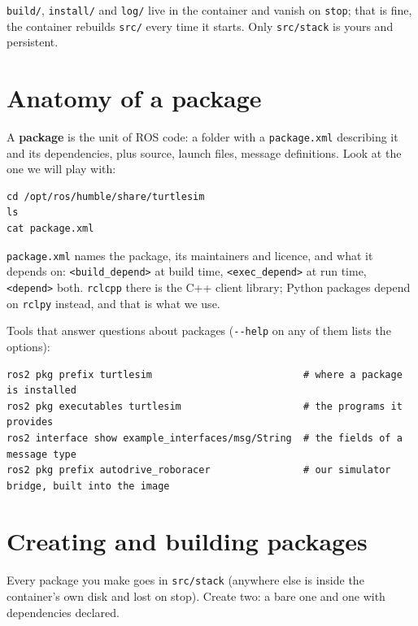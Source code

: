 \documentclass[11pt,a4paper]{article}
\begin{document}
\texttt{build/}, \texttt{install/} and \texttt{log/} live in the container and vanish on
\texttt{stop}; that is fine, the container rebuilds \texttt{src/} every time it starts. Only
\texttt{src/stack} is yours and persistent.


\section{Anatomy of a package}

A \textbf{package} is the unit of ROS code: a folder with a \texttt{package.xml} describing it
and its dependencies, plus source, launch files, message definitions. Look at the one we will
play with:

\begin{lstlisting}
cd /opt/ros/humble/share/turtlesim
ls
cat package.xml
\end{lstlisting}

\texttt{package.xml} names the package, its maintainers and licence, and what it depends on:
\texttt{<build\_depend>} at build time, \texttt{<exec\_depend>} at run time,
\texttt{<depend>} both. \texttt{rclcpp} there is the C++ client library; Python packages depend on \texttt{rclpy}
instead, and that is what we use.

Tools that answer questions about packages (\texttt{-{}-help} on any of them lists the options):

\begin{lstlisting}
ros2 pkg prefix turtlesim                          # where a package is installed
ros2 pkg executables turtlesim                     # the programs it provides
ros2 interface show example_interfaces/msg/String  # the fields of a message type
ros2 pkg prefix autodrive_roboracer                # our simulator bridge, built into the image
\end{lstlisting}

\section{Creating and building packages}

Every package you make goes in \texttt{src/stack} (anywhere else is inside the container's own
disk and lost on stop). Create two: a bare one and one with dependencies declared.
\end{document}
